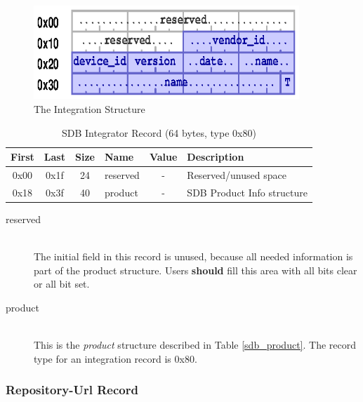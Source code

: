 \documentclass[a4paper, 12pt]{article}
\begin{document}
\begin{figure}[h]
\centering%
\includegraphics[width=100mm]{img/sdb-integration.ps}
\caption{The Integration Structure}
\label{fig:FigureIntegration}
\end{figure}

\begin{center}
  \begin{savenotes}
    \begin{table}[!ht]\footnotesize
      \caption{SDB Integrator Record (64 bytes, type 0x80)}\label{sdb_integrator}\centering
        \begin{tabular}{| c | c | c | l | c | p{5cm} |} \hline
        First & Last & Size & Name & Value & Description \\ \hline
        0x00 & 0x1f & 24 & reserved & - & Reserved/unused space \\ \hline
        0x18 & 0x3f & 40 & product & - & SDB Product Info structure \\ \hline
        \end{tabular}
    \end{table}
  \end{savenotes}
\end{center}

\begin{description}
\item[reserved] \hfill \\
The initial field in this record is unused, because all needed information is
part of the product structure. Users \textbf{should} fill this area with all bits
clear or all bit set.

\item[product] \hfill \\
This is the \textit{product} structure described in Table \ref{sdb_product}. The
record type for an integration record is 0x80.
\end{description}

\pagebreak 

\subsubsection{Repository-Url Record}
\end{document}
